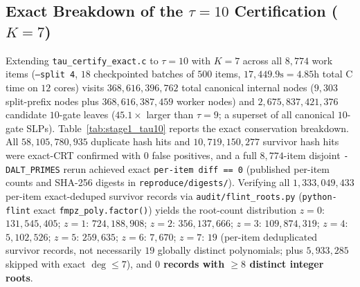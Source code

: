 \documentclass[11pt]{article}
\newcommand{\code}[1]{\texttt{#1}}
\begin{document}
\subsection{Exact Breakdown of the $\tau = 10$ Certification ($K = 7$)}
Extending \code{tau\_certify\_exact.c} to $\tau = 10$ with $K = 7$ across all $8{,}774$ work items (\code{--split 4}, $18$ checkpointed batches of $500$ items, $17{,}449.9\text{s} = 4.85\text{h}$ total C time on $12$ cores) visits $368{,}616{,}396{,}762$ total canonical internal nodes ($9{,}303$ split-prefix nodes plus $368{,}616{,}387{,}459$ worker nodes) and $2{,}675{,}837{,}421{,}376$ candidate $10$-gate leaves ($45.1\times$ larger than $\tau = 9$; a superset of all canonical $10$-gate SLPs). Table~\ref{tab:stage1_tau10} reports the exact conservation breakdown. All $58{,}105{,}780{,}935$ duplicate hash hits and $10{,}719{,}150{,}277$ survivor hash hits were exact-CRT confirmed with $0$ false positives, and a full $8{,}774$-item disjoint \code{-DALT\_PRIMES} rerun achieved exact \code{per-item diff == 0} (published per-item counts and SHA-256 digests in \code{reproduce/digests/}). Verifying all $1{,}333{,}049{,}433$ per-item exact-deduped survivor records via \code{audit/flint\_roots.py} (\code{python-flint} exact \code{fmpz\_poly.factor()}) yields the root-count distribution $z=0$: $131{,}545{,}405$; $z=1$: $724{,}188{,}908$; $z=2$: $356{,}137{,}666$; $z=3$: $109{,}874{,}319$; $z=4$: $5{,}102{,}526$; $z=5$: $259{,}635$; $z=6$: $7{,}670$; $z=7$: $19$ (per-item deduplicated survivor records, not necessarily $19$ globally distinct polynomials; plus $5{,}933{,}285$ skipped with exact $\deg \le 7$), and \textbf{$0$ records with $\ge 8$ distinct integer roots}.
\end{document}
